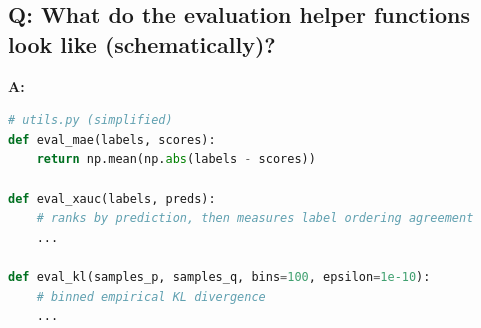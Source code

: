 \subsection{Q: What do the evaluation helper functions look like (schematically)?}
\noindent\textbf{A:}
\begin{lstlisting}[language=Python]
# utils.py (simplified)
def eval_mae(labels, scores):
    return np.mean(np.abs(labels - scores))

def eval_xauc(labels, preds):
    # ranks by prediction, then measures label ordering agreement
    ...

def eval_kl(samples_p, samples_q, bins=100, epsilon=1e-10):
    # binned empirical KL divergence
    ...
\end{lstlisting}
